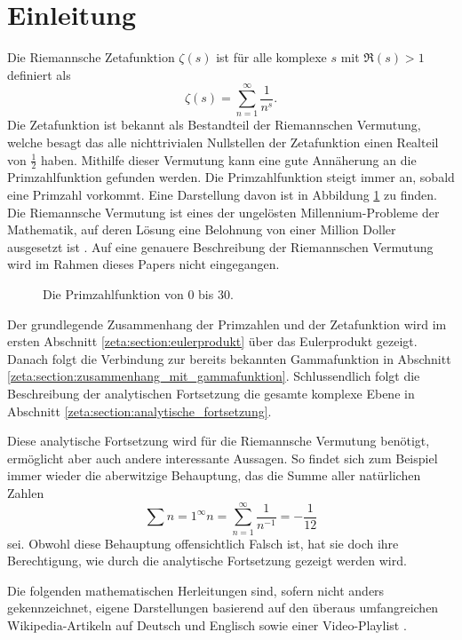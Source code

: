 \section{Einleitung} \label{zeta:section:einleitung}

Die Riemannsche Zetafunktion $\zeta(s)$ ist für alle komplexe $s$ mit $\Re(s) > 1$ definiert als
\begin{equation}\label{zeta:equation1}
    \zeta(s)
    =
    \sum_{n=1}^{\infty}
    \frac{1}{n^s}.
\end{equation}
Die Zetafunktion ist bekannt als Bestandteil der Riemannschen Vermutung, welche besagt das alle nichttrivialen Nullstellen der Zetafunktion einen Realteil von $\frac{1}{2}$ haben.
Mithilfe dieser Vermutung kann eine gute Annäherung an die Primzahlfunktion gefunden werden.
Die Primzahlfunktion steigt immer an, sobald eine Primzahl vorkommt.
Eine Darstellung davon ist in Abbildung \ref{fig:zeta:primzahlfunktion} zu finden.
Die Riemannsche Vermutung ist eines der ungelösten Millennium-Probleme der Mathematik, auf deren Lösung eine Belohnung von einer Million Doller ausgesetzt ist \cite{zeta:online:millennium}.
Auf eine genauere Beschreibung der Riemannschen Vermutung wird im Rahmen dieses Papers nicht eingegangen.
\begin{figure}
    \centering
    
    \caption{Die Primzahlfunktion von $0$ bis $30$.}
    \label{fig:zeta:primzahlfunktion}
\end{figure}

Der grundlegende Zusammenhang der Primzahlen und der Zetafunktion wird im ersten Abschnitt \ref{zeta:section:eulerprodukt} über das Eulerprodukt gezeigt.
Danach folgt die Verbindung zur bereits bekannten Gammafunktion in Abschnitt \ref{zeta:section:zusammenhang_mit_gammafunktion}.
Schlussendlich folgt die Beschreibung der analytischen Fortsetzung die gesamte komplexe Ebene in Abschnitt \ref{zeta:section:analytische_fortsetzung}.

Diese analytische Fortsetzung wird für die Riemannsche Vermutung benötigt, ermöglicht aber auch andere interessante Aussagen.
So findet sich zum Beispiel immer wieder die aberwitzige Behauptung, das die Summe aller natürlichen Zahlen
\begin{equation*}
    \sum{n=1}^{\infty} n
    =
    \sum_{n=1}^{\infty}
    \frac{1}{n^{-1}}
    =
    -\frac{1}{12}
\end{equation*}
sei.
Obwohl diese Behauptung offensichtlich Falsch ist, hat sie doch ihre Berechtigung, wie durch die analytische Fortsetzung gezeigt werden wird.

Die folgenden mathematischen Herleitungen sind, sofern nicht anders gekennzeichnet, eigene Darstellungen basierend auf den überaus umfangreichen Wikipedia-Artikeln auf Deutsch \cite{zeta:online:wiki_de} und Englisch \cite{zeta:online:wiki_en} sowie einer Video-Playlist \cite{zeta:online:mryoumath}.
